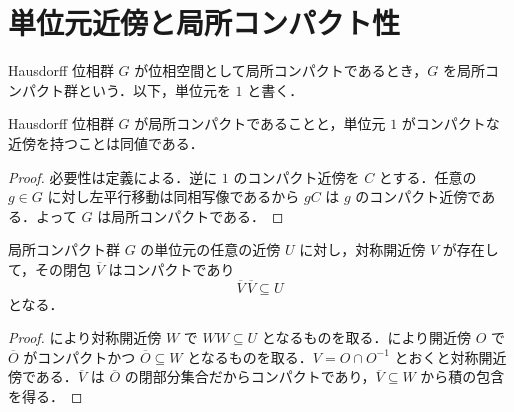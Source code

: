 \section{単位元近傍と局所コンパクト性}
\begin{defn}[局所コンパクト群]
Hausdorff 位相群 $G$ が位相空間として局所コンパクトであるとき，$G$ を局所コンパクト群という．以下，単位元を $1$ と書く．
\end{defn}
\begin{prop}[局所コンパクト群の単位元による判定]
Hausdorff 位相群 $G$ が局所コンパクトであることと，単位元 $1$ がコンパクトな近傍を持つことは同値である．
\end{prop}
\begin{proof}
必要性は定義による．逆に $1$ のコンパクト近傍を $C$ とする．任意の $g\in G$ に対し左平行移動は同相写像であるから $gC$ は $g$ のコンパクト近傍である．よって $G$ は局所コンパクトである．
\end{proof}
\begin{prop}[対称なコンパクト近傍の縮小]
局所コンパクト群 $G$ の単位元の任意の近傍 $U$ に対し，対称開近傍 $V$ が存在して，その閉包 $\overline V$ はコンパクトであり
\[
 \overline V\,\overline V\subseteq U
\]
となる．
\end{prop}
\begin{proof}
により対称開近傍 $W$ で $WW\subseteq U$ となるものを取る．により開近傍 $O$ で $\overline O$ がコンパクトかつ $\overline O\subseteq W$ となるものを取る．$V=O\cap O^{-1}$ とおくと対称開近傍である．$\overline V$ は $\overline O$ の閉部分集合だからコンパクトであり，$\overline V\subseteq W$ から積の包含を得る．
\end{proof}
